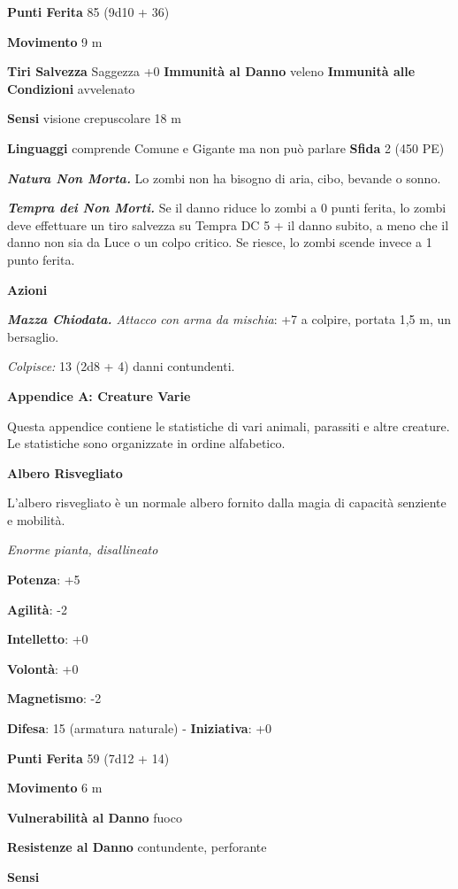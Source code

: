 \begin{multicols}{2}
\textbf{Punti Ferita} 85 (9d10 + 36)

\textbf{Movimento} 9 m

\textbf{Tiri Salvezza} Saggezza +0 \textbf{Immunità al Danno} veleno
\textbf{Immunità alle Condizioni} avvelenato

\textbf{Sensi} visione crepuscolare 18 m

\textbf{Linguaggi} comprende Comune e Gigante ma non può parlare
\textbf{Sfida} 2 (450 PE)

\emph{\textbf{Natura Non Morta.}} Lo zombi non ha bisogno di aria, cibo,
bevande o sonno.

\emph{\textbf{Tempra dei Non Morti.}} Se il danno riduce lo zombi a 0
punti ferita, lo zombi deve effettuare un tiro salvezza su Tempra
DC 5 + il danno subito, a meno che il danno non sia da Luce o un colpo
critico. Se riesce, lo zombi scende invece a 1 punto ferita.

\textbf{Azioni}

\emph{\textbf{Mazza Chiodata.} Attacco con arma da mischia}: +7 a
colpire, portata 1,5 m, un bersaglio.

\emph{Colpisce:} 13 (2d8 + 4) danni contundenti.



\textbf{Appendice A: Creature Varie}

Questa appendice contiene le statistiche di vari animali, parassiti e
altre creature. Le statistiche sono organizzate in ordine alfabetico.

\textbf{Albero Risvegliato}

L'albero risvegliato è un normale albero fornito dalla magia di capacità
senziente e mobilità.

\emph{Enorme pianta, disallineato}

\textbf{Potenza}: +5

\textbf{Agilità}: -2

\textbf{Intelletto}: +0

\textbf{Volontà}: +0

\textbf{Magnetismo}: -2

\textbf{Difesa}: 15 (armatura naturale) - \textbf{Iniziativa}: +0

\textbf{Punti Ferita} 59 (7d12 + 14)

\textbf{Movimento} 6 m

\textbf{Vulnerabilità al Danno} fuoco

\textbf{Resistenze al Danno} contundente, perforante

\textbf{Sensi} 


\end{multicols}
